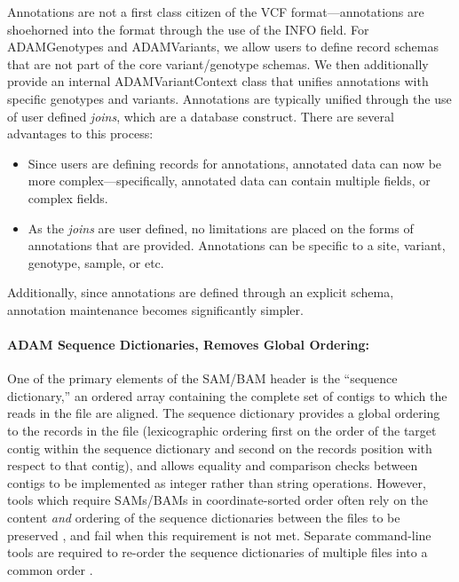 \documentclass{bioinfo}
\begin{document}
Annotations are not a first class citizen of the VCF format---annotations are shoehorned into the format through the use of the INFO field. For ADAMGenotypes and
ADAMVariants, we allow users to define record schemas that are not part of the core variant/genotype schemas. We then additionally provide an internal ADAMVariantContext
class that unifies annotations with specific genotypes and variants. Annotations are typically unified through the use of user defined \emph{joins}, which are a database
construct. There are several advantages to this process:

\begin{itemize}
\item Since users are defining records for annotations, annotated data can now be more complex---specifically, annotated data can contain multiple fields, or complex fields.
\item As the \emph{joins} are user defined, no limitations are placed on the forms of annotations that are provided. Annotations can be specific to a site, variant, genotype,
sample, or etc.
\end{itemize}

Additionally, since annotations are defined through an explicit schema, annotation maintenance becomes significantly simpler.

\paragraph{ADAM Sequence Dictionaries, Removes Global Ordering:}
\label{sec:adam-sequence-dictionaries}

One of the primary elements of the SAM/BAM header is the ``sequence dictionary,'' an ordered array containing the complete set of contigs to which the reads in the file are aligned.
The sequence dictionary provides a global ordering to the records in the file (lexicographic ordering first on the order of the target contig within the sequence dictionary and second on the records position with respect to that contig), and allows equality and comparison checks between contigs to be implemented as integer rather than string operations.
However, tools which require SAMs/BAMs in coordinate-sorted order often rely on the content \emph{and} ordering of the sequence dictionaries between the files to be preserved \citep*{gatk-ordering}, and fail when this requirement is not met.  
Separate command-line tools are required to re-order the sequence dictionaries of multiple files into a common order \citep*{picard}.
\end{document}
